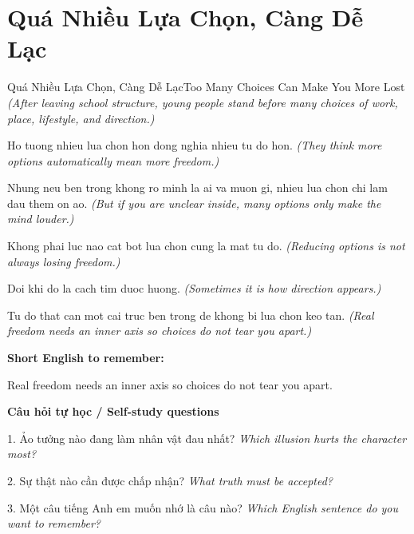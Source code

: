 \section{Quá Nhiều Lựa Chọn, Càng Dễ Lạc}
\begin{truyen}{Quá Nhiều Lựa Chọn, Càng Dễ Lạc}{Too Many Choices Can Make You More Lost}
\textit{(After leaving school structure, young people stand before many choices of work, place, lifestyle, and direction.)}

Ho tuong nhieu lua chon hon dong nghia nhieu tu do hon.
\textit{(They think more options automatically mean more freedom.)}

Nhung neu ben trong khong ro minh la ai va muon gi, nhieu lua chon chi lam dau them on ao.
\textit{(But if you are unclear inside, many options only make the mind louder.)}

Khong phai luc nao cat bot lua chon cung la mat tu do.
\textit{(Reducing options is not always losing freedom.)}

Doi khi do la cach tim duoc huong.
\textit{(Sometimes it is how direction appears.)}

\end{truyen}

\begin{baihoc}
Tu do that can mot cai truc ben trong de khong bi lua chon keo tan.
\textit{(Real freedom needs an inner axis so choices do not tear you apart.)}
\end{baihoc}

\begin{ghinhoanh}
\textbf{Short English to remember:}

Real freedom needs an inner axis so choices do not tear you apart.

\end{ghinhoanh}

\begin{tuhocnhanh}
\textbf{Câu hỏi tự học / Self-study questions}

1. Ảo tưởng nào đang làm nhân vật đau nhất? \textit{Which illusion hurts the character most?}

2. Sự thật nào cần được chấp nhận? \textit{What truth must be accepted?}

3. Một câu tiếng Anh em muốn nhớ là câu nào? \textit{Which English sentence do you want to remember?}
\end{tuhocnhanh}
\ngancach

